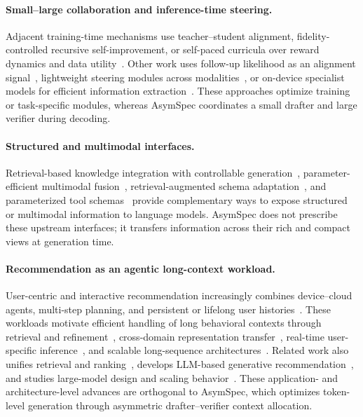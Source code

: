\documentclass[11pt]{article}
\theoremstyle{plain}
\theoremstyle{definition}
\begin{document}
\paragraph{Small--large collaboration and inference-time steering.}
Adjacent training-time mechanisms use teacher--student alignment, fidelity-controlled recursive self-improvement, or self-paced curricula over reward dynamics and data utility~\citep{DBLP:conf/emnlp/0020TCSTJ024,zhang2026can,zhi-etal-2026-spard}. Other work uses follow-up likelihood as an alignment signal~\citep{DBLP:conf/aaai/0020C0TGT025}, lightweight steering modules across modalities~\citep{feng-etal-2025-steermoe}, or on-device specialist models for efficient information extraction~\citep{wen-etal-2025-ondevice}. These approaches optimize training or task-specific modules, whereas AsymSpec coordinates a small drafter and large verifier during decoding.

\paragraph{Structured and multimodal interfaces.}
Retrieval-based knowledge integration with controllable generation~\citep{shen2026prompting}, parameter-efficient multimodal fusion~\citep{liang-etal-2022-modular}, retrieval-augmented schema adaptation~\citep{liang-etal-2025-adaptive}, and parameterized tool schemas~\citep{liang-etal-2025-schema} provide complementary ways to expose structured or multimodal information to language models. AsymSpec does not prescribe these upstream interfaces; it transfers information across their rich and compact views at generation time.

\paragraph{Recommendation as an agentic long-context workload.}
User-centric and interactive recommendation increasingly combines device--cloud agents, multi-step planning, and persistent or lifelong user histories~\citep{zhang2026next,yu2025thought,zhou2026survey}. These workloads motivate efficient handling of long behavioral contexts through retrieval and refinement~\citep{xu2025multi,shen2024exploring}, cross-domain representation transfer~\citep{zhang2024unified}, real-time user-specific inference~\citep{xie2025breaking}, and scalable long-sequence architectures~\citep{ye2026fuxi,pan2025revisiting}. Related work also unifies retrieval and ranking~\citep{zhang2025killing}, develops LLM-based generative recommendation~\citep{wang2025generative}, and studies large-model design and scaling behavior~\citep{guo2024scaling,shen2025plaw}. These application- and architecture-level advances are orthogonal to AsymSpec, which optimizes token-level generation through asymmetric drafter--verifier context allocation.
\endgroup
\end{document}
